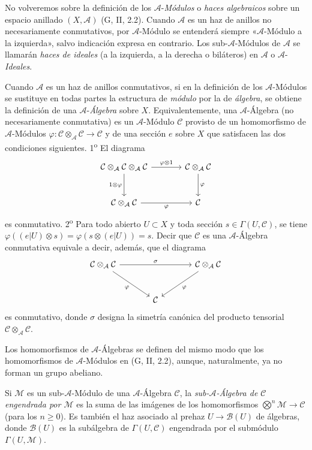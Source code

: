 \begin{env}[4.1.3]
\label{0.4.1.3-fr}
No volveremos sobre la definición de los $\mathcal{A}$-\emph{Módulos} o
\emph{haces algebraicos} sobre un espacio anillado $(X,\mathcal{A})$
(G, II, 2.2). Cuando $\mathcal{A}$ es un haz de anillos no necesariamente
conmutativos, por $\mathcal{A}$-Módulo se entenderá siempre
«$\mathcal{A}$-Módulo a la izquierda», salvo indicación expresa en contrario.
Los sub-$\mathcal{A}$-Módulos de $\mathcal{A}$ se llamarán
\emph{haces de ideales} (a la izquierda, a la derecha o biláteros) en
$\mathcal{A}$ o $\mathcal{A}$-\emph{Ideales}.

Cuando $\mathcal{A}$ es un haz de anillos conmutativos, si en la definición de
los $\mathcal{A}$-Módulos se sustituye en todas partes la estructura de
\emph{módulo} por la de \emph{álgebra}, se obtiene la definición de una
$\mathcal{A}$-\emph{Álgebra} sobre $X$. Equivalentemente, una
$\mathcal{A}$-Álgebra (no necesariamente conmutativa) es un
$\mathcal{A}$-Módulo $\mathcal{C}$ provisto de un homomorfismo de
$\mathcal{A}$-Módulos
$\varphi:\mathcal{C}\otimes_{\mathcal{A}}\mathcal{C}\to\mathcal{C}$ y de una
sección $e$ sobre $X$ que satisfacen las dos condiciones siguientes.
1\textsuperscript{o} El diagrama
\[
\begin{tikzcd}[column sep=large,row sep=large]
\mathcal{C}\otimes_{\mathcal{A}}\mathcal{C}\otimes_{\mathcal{A}}\mathcal{C}
  \arrow[r,"\varphi\otimes 1"]
  \arrow[d,"1\otimes\varphi"']
&
\mathcal{C}\otimes_{\mathcal{A}}\mathcal{C}
  \arrow[d,"\varphi"]
\\
\mathcal{C}\otimes_{\mathcal{A}}\mathcal{C}
  \arrow[r,"\varphi"']
&
\mathcal{C}
\end{tikzcd}
\]
es conmutativo. 2\textsuperscript{o} Para todo abierto $U\subset X$ y toda
sección $s\in\Gamma(U,\mathcal{C})$, se tiene
$\varphi((e|U)\otimes s)=\varphi(s\otimes(e|U))=s$. Decir que
$\mathcal{C}$ es una $\mathcal{A}$-Álgebra conmutativa equivale a decir,
además, que el diagrama
\[
\begin{tikzcd}[column sep=large,row sep=large]
\mathcal{C}\otimes_{\mathcal{A}}\mathcal{C}
  \arrow[rr,"\sigma"]
  \arrow[dr,"\varphi"']
&&
\mathcal{C}\otimes_{\mathcal{A}}\mathcal{C}
  \arrow[dl,"\varphi"]
\\
& \mathcal{C} &
\end{tikzcd}
\]
es conmutativo, donde $\sigma$ designa la simetría canónica del producto
tensorial $\mathcal{C}\otimes_{\mathcal{A}}\mathcal{C}$.

Los homomorfismos de $\mathcal{A}$-Álgebras se definen del mismo modo que los
homomorfismos de $\mathcal{A}$-Módulos en (G, II, 2.2), aunque, naturalmente,
ya no forman un grupo abeliano.

Si $\mathcal{M}$ es un sub-$\mathcal{A}$-Módulo de una
$\mathcal{A}$-Álgebra $\mathcal{C}$, la \emph{sub-$\mathcal{A}$-Álgebra de
$\mathcal{C}$ engendrada por $\mathcal{M}$} es la suma de las imágenes de los
homomorfismos $\bigotimes^n\mathcal{M}\to\mathcal{C}$ (para los
$n\geqslant 0$). Es también el haz asociado al prehaz
$U\to\mathcal{B}(U)$ de álgebras, donde $\mathcal{B}(U)$ es la subálgebra de
$\Gamma(U,\mathcal{C})$ engendrada por el submódulo
$\Gamma(U,\mathcal{M})$.
\end{env}
